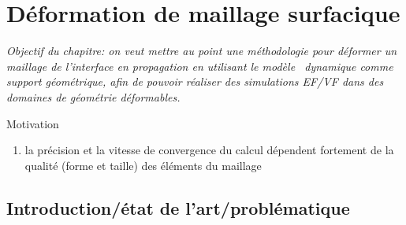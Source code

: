 \chapter{Déformation de maillage surfacique}

\textit{Objectif du chapitre: on veut mettre au point une méthodologie pour déformer un maillage de l'interface en propagation en utilisant le modèle \brep\ dynamique comme support géométrique, afin de pouvoir réaliser des simulations EF/VF dans des domaines de géométrie déformables.}

\par\bigskip

Motivation
\begin{enumerate}
	\item la précision et la vitesse de convergence du calcul dépendent fortement de la qualité (forme et taille) des éléments du maillage
\end{enumerate}

\section{Introduction/état de l'art/problématique}

